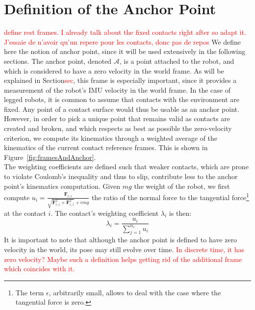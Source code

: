\documentclass{IJCAS}
\begin{document}
\section{Definition of the Anchor Point}\label{sec:anchor_point}
\textcolor{red}{define rest frames. I already talk about the fixed contacts right after so adapt it.}
\textcolor{red}{J'essaie de n'avoir qu'un repere pour les contacts, donc pas de repos}
We define here the notion of anchor point, since it will be used extensively in the following sections. The anchor point, denoted $\mathcal{A}$, is a point attached to the robot, and which is considered to have a zero velocity in the world frame. As will be explained in Section\textcolor{red}{sec}, this frame is especially important, since it provides a measurement of the robot's IMU velocity in the world frame. In the case of legged robots, it is common to assume that contacts with the environment are fixed. Any point of a contact surface would thus be usable as an anchor point. However, in order to pick a unique point that remains valid as contacts are created and broken, and which respects as best as possible the zero-velocity criterion, we compute its kinematics through a weighted average of the kinematics of the current contact reference frames. This is shown in Figure~\ref{fig:framesAndAnchor}. \\
The weighting coefficients are defined such that weaker contacts, which are prone to violate Coulomb's inequality and thus to slip, contribute less to the anchor point's kinematics computation. Given $mg$ the weight of the robot, we first compute $u_{i} = \frac{\boldsymbol{F}_{i,z}}{\sqrt{\boldsymbol{F}_{i,z}^2 + \boldsymbol{F}_{i,z}^2} + \epsilon mg}$ the ratio of the normal force to the tangential force\footnote{The term $\epsilon$, arbitrarily small, allows to deal with the case where the tangential force is zero.} at the contact $i$. The contact's weighting coefficient $\lambda_{i}$ is then:
\begin{equation}
    \lambda_{i}=\frac{u_{i}}{\sum^{n_{c}}_{j=1}u_{i}}
\end{equation}
It is important to note that although the anchor point is defined to have zero velocity in the world, its pose may still evolve over time. \textcolor{red}{In discrete time, it has zero velocity? Maybe such a definition helps getting rid of the additional frame which coincides with it.}
\end{document}
